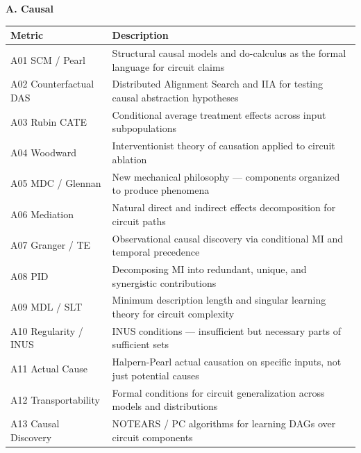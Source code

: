 \documentclass{article}
\begin{document}

\begingroup
\small
\setlength{\tabcolsep}{4pt}
\renewcommand{\arraystretch}{1.15}
\noindent\textbf{A. Causal}\par
\vspace{4pt}\noindent{}
\nopagebreak

\centering
\begin{tabular}{@{}lp{10cm}@{}}
\toprule
\textbf{Metric} & \textbf{Description} \\
\midrule
A01 SCM / Pearl & Structural causal models and do-calculus as the formal language for circuit claims \\
\midrule
A02 Counterfactual DAS & Distributed Alignment Search and IIA for testing causal abstraction hypotheses \\
\midrule
A03 Rubin CATE & Conditional average treatment effects across input subpopulations \\
\midrule
A04 Woodward & Interventionist theory of causation applied to circuit ablation \\
\midrule
A05 MDC / Glennan & New mechanical philosophy --- components organized to produce phenomena \\
\midrule
A06 Mediation & Natural direct and indirect effects decomposition for circuit paths \\
\midrule
A07 Granger / TE & Observational causal discovery via conditional MI and temporal precedence \\
\midrule
A08 PID & Decomposing MI into redundant, unique, and synergistic contributions \\
\midrule
A09 MDL / SLT & Minimum description length and singular learning theory for circuit complexity \\
\midrule
A10 Regularity / INUS & INUS conditions --- insufficient but necessary parts of sufficient sets \\
\midrule
A11 Actual Cause & Halpern-Pearl actual causation on specific inputs, not just potential causes \\
\midrule
A12 Transportability & Formal conditions for circuit generalization across models and distributions \\
\midrule
A13 Causal Discovery & NOTEARS / PC algorithms for learning DAGs over circuit components \\
\bottomrule
\end{tabular}
\medskip
\end{document}

